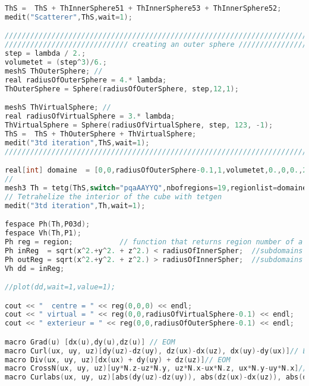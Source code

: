 \begin{lstlisting}[language=C]
ThS =  ThS + ThInnerSphere51 + ThInnerSphere53 + ThInnerSphere52;
medit("Scatterer",ThS,wait=1);

//////////////////////////////////////////////////////////////////////////////
///////////////////////////// creating an outer sphere //////////////////////////
step = lambda / 2.;
volumetet = (step^3)/6.;  
meshS ThOuterSphere; // 
real radiusOfOuterSphere = 4.* lambda;
ThOuterSphere = Sphere(radiusOfOuterSphere, step,12,1);

meshS ThVirtualSphere; // 
real radiusOfVirtualSphere = 3.* lambda;
ThVirtualSphere = Sphere(radiusOfVirtualSphere, step, 123, -1);
ThS =  ThS + ThOuterSphere + ThVirtualSphere;
medit("3td iteration",ThS,wait=1);
/////////////////////////////////////////////////////////////////////////////

real[int] domaine  = [0,0,radiusOfOuterSphere-0.1,1,volumetet,0.,0,0.,2,volumetetIn,0.,0,radiusOfVirtualSphere-0.1,3,volumetet,ddx,0,0.,4,volumetetIn,-ddx,0,0,5,volumetetIn,0,ddx,0,6,volumetetIn,0,-ddx,0,7,volumetetIn, ddx,ddy,0,8,volumetetIn,ddx,-ddy,0.,9,volumetetIn,ddx+ddy,0,0.,10,volumetetIn,-ddx,ddy,0,11,volumetetIn,-ddx,-ddy,0,12,volumetetIn,-ddx-ddy,0,0,13,volumetetIn, 0,ddx+ddy,0,14,volumetetIn, -ddy,ddx,0,15,volumetetIn, ddy,ddx,0,16,volumetetIn, 0, -ddx-ddy,0,17,volumetetIn, ddy,-ddx,0,18,volumetetIn, -ddy, -ddx,0,19,volumetetIn];
//
mesh3 Th = tetg(ThS,switch="pqaAAYYQ",nbofregions=19,regionlist=domaine);
// Tetrahelize the interior of the cube with tetgen
medit("3td iteration",Th,wait=1);

fespace Ph(Th,P03d);
fespace Vh(Th,P1);
Ph reg = region;           // function that returns region number of a point XY
Ph inReg  = sqrt(x^2.+y^2. + z^2.) < radiusOfInnerSpher;  //subdomains for inside the sratterer
Ph outReg = sqrt(x^2.+y^2. + z^2.) > radiusOfInnerSpher;  //subdomains for outside the scatterer
Vh dd = inReg;

//plot(dd,wait=1,value=1);

cout << "  centre = " << reg(0,0,0) << endl;
cout << " virtual = " << reg(0,0,radiusOfVirtualSphere-0.1) << endl;
cout << " exterieur = " << reg(0,0,radiusOfOuterSphere-0.1) << endl;

macro Grad(u) [dx(u),dy(u),dz(u)] // EOM
macro Curl(ux, uy, uz)[dy(uz)-dz(uy), dz(ux)-dx(uz), dx(uy)-dy(ux)]// EOM
macro Div(ux, uy, uz)[dx(ux) + dy(uy) + dz(uz)]// EOM
macro CrossN(ux, uy, uz)[uy*N.z-uz*N.y, uz*N.x-ux*N.z, ux*N.y-uy*N.x]// EOM
macro Curlabs(ux, uy, uz)[abs(dy(uz)-dz(uy)), abs(dz(ux)-dx(uz)), abs(dx(uy)-dy(ux))]// EOM


\end{lstlisting}

